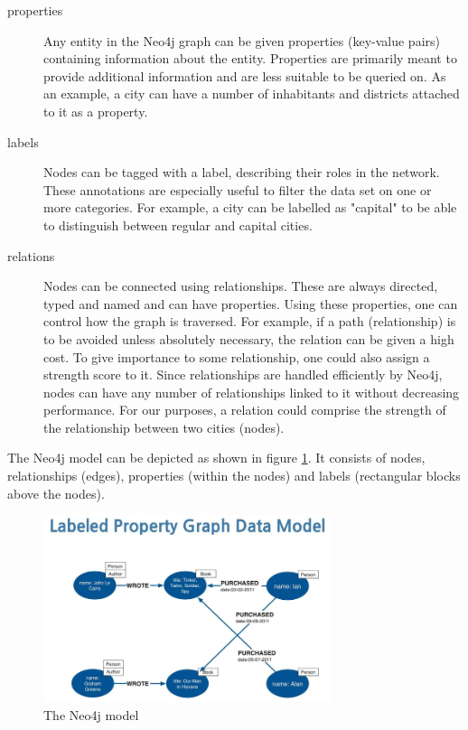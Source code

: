 \begin{description}
\item[properties] Any entity in the Neo4j graph can be given properties (key-value pairs) containing information about the entity. Properties are primarily meant to provide additional information and are less suitable to be queried on. As an example, a city can have a number of inhabitants and districts attached to it as a property.
\item[labels] Nodes can be tagged with a label, describing their roles in the network. These annotations are especially useful to filter the data set on one or more categories. For example, a city can be labelled as "capital" to be able to distinguish between regular and capital cities.
\item[relations] Nodes can be connected using relationships. These are always directed, typed and named and can have properties. Using these properties, one can control how the graph is traversed. For example, if a path (relationship) is to be avoided unless absolutely necessary, the relation can be given a high cost. To give importance to some relationship, one could also assign a strength score to it. Since relationships are handled efficiently by Neo4j, nodes can have any number of relationships linked to it without decreasing performance. For our purposes, a relation could comprise the strength of the relationship between two cities (nodes).
\end{description}

The Neo4j model can be depicted as shown in figure \ref{fig:neo4j}. It consists of nodes, relationships (edges), properties (within the nodes) and labels (rectangular blocks above the nodes).

\begin{figure}
\centering
\includegraphics[width=0.75\textwidth]{neo4j}
\caption{The Neo4j model}
\label{fig:neo4j}
\end{figure}

